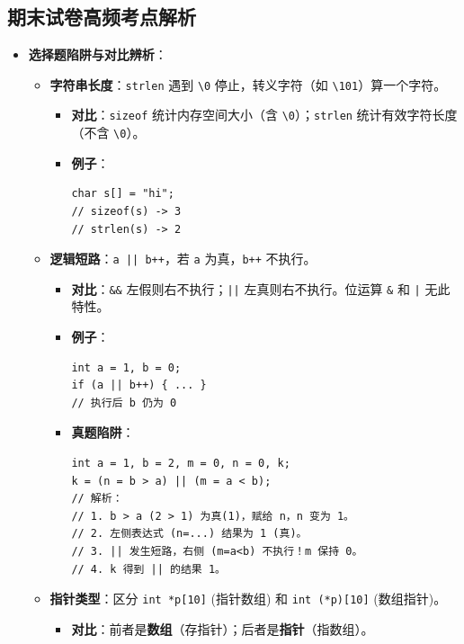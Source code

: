 \documentclass[a4paper,12pt]{article}
\begin{document}
\subsection{期末试卷高频考点解析}
\begin{itemize}
    \item \textbf{选择题陷阱与对比辨析}：
    \begin{itemize}
        \item \textbf{字符串长度}：\texttt{strlen} 遇到 \texttt{\textbackslash 0} 停止，转义字符（如 \texttt{\textbackslash 101}）算一个字符。
        \begin{itemize}
            \item \textbf{对比}：\texttt{sizeof} 统计内存空间大小（含 \texttt{\textbackslash 0}）；\texttt{strlen} 统计有效字符长度（不含 \texttt{\textbackslash 0}）。
            \item \textbf{例子}：
\begin{lstlisting}
char s[] = "hi";
// sizeof(s) -> 3
// strlen(s) -> 2
\end{lstlisting}
        \end{itemize}
        \item \textbf{逻辑短路}：\texttt{a || b++}，若 \texttt{a} 为真，\texttt{b++} 不执行。
        \begin{itemize}
            \item \textbf{对比}：\texttt{\&\&} 左假则右不执行；\texttt{||} 左真则右不执行。位运算 \texttt{\&} 和 \texttt{|} 无此特性。
            \item \textbf{例子}：
\begin{lstlisting}
int a = 1, b = 0;
if (a || b++) { ... }
// 执行后 b 仍为 0
\end{lstlisting}
            \item \textbf{真题陷阱}：
\begin{lstlisting}
int a = 1, b = 2, m = 0, n = 0, k;
k = (n = b > a) || (m = a < b);
// 解析：
// 1. b > a (2 > 1) 为真(1)，赋给 n，n 变为 1。
// 2. 左侧表达式 (n=...) 结果为 1 (真)。
// 3. || 发生短路，右侧 (m=a<b) 不执行！m 保持 0。
// 4. k 得到 || 的结果 1。
\end{lstlisting}
        \end{itemize}
        \item \textbf{指针类型}：区分 \texttt{int *p[10]} (指针数组) 和 \texttt{int (*p)[10]} (数组指针)。
        \begin{itemize}
            \item \textbf{对比}：前者是\textbf{数组}（存指针）；后者是\textbf{指针}（指数组）。

\end{itemize}
\end{itemize}
\end{itemize}
\end{document}

